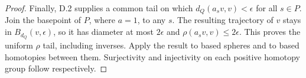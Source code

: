 \begin{proof}
Finally, D.2 supplies a common tail on which
$d_Q(a_sv,v)<\epsilon$ for all $s\in P$.  Join the basepoint of
$P$, where $a=1$, to any $s$.  The resulting trajectory of $v$
stays in $B_{d_Q}(v,\epsilon)$, so it has diameter at most
$2\epsilon$ and $\rho(a_sv,v)\leq2\epsilon$.  This proves the
uniform $\rho$ tail, including inverses.  Apply the result to
based spheres and to based homotopies between them.  Surjectivity
and injectivity on each positive homotopy group follow respectively.
\end{proof}
